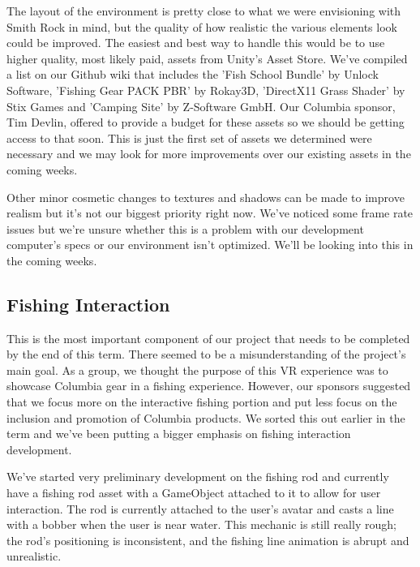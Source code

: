 \documentclass[10pt,journal,compsoc,onecolumn, draftclsnofoot]{IEEEtran}
\begin{document}
The layout of the environment is pretty close to what we were envisioning with Smith Rock in mind, but the quality of how realistic the various elements look could be improved. The easiest and best way to handle this would be to use higher quality, most likely paid, assets from Unity's Asset Store. We've compiled a list on our Github wiki that includes the 'Fish School Bundle' by Unlock Software, 'Fishing Gear PACK PBR' by Rokay3D, 'DirectX11 Grass Shader' by Stix Games and 'Camping Site' by Z-Software GmbH. Our Columbia sponsor, Tim Devlin, offered to provide a budget for these assets so we should be getting access to that soon. This is just the first set of assets we determined were necessary and we may look for more improvements over our existing assets in the coming weeks.

Other minor cosmetic changes to textures and shadows can be made to improve realism but it's not our biggest priority right now. We've noticed some frame rate issues but we're unsure whether this is a problem with our development computer's specs or our environment isn't optimized. We'll be looking into this in the coming weeks.

\subsection{Fishing Interaction}
This is the most important component of our project that needs to be completed by the end of this term. There seemed to be a misunderstanding of the project's main goal. As a group, we thought the purpose of this VR experience was to showcase Columbia gear in a fishing experience. However, our sponsors suggested that we focus more on the interactive fishing portion and put less focus on the inclusion and promotion of Columbia products. We sorted this out earlier in the term and we've been putting a bigger emphasis on fishing interaction development.

We've started very preliminary development on the fishing rod and currently have a fishing rod asset with a GameObject attached to it to allow for user interaction. The rod is currently attached to the user's avatar and casts a line with a bobber when the user is near water. This mechanic is still really rough; the rod's positioning is inconsistent, and the fishing line animation is abrupt and unrealistic.
\end{document}
